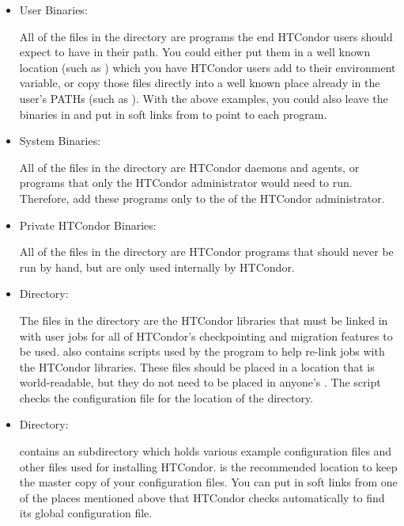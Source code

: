 \begin{description}
\begin{description}
\begin{itemize}
     \item User Binaries:

     All of the files in the  directory are programs the end
     HTCondor users should expect to have in their path.  You could
     either put them in a well known location (such as
     ) which you have HTCondor users add to
     their  environment variable, or copy those files
     directly into a well known place already in the user's PATHs (such as
     ).  With the above examples, you could also
     leave the binaries in  and put in
     soft links from  to point to each program.

     \item System Binaries:

     All of the files in the  directory are HTCondor daemons and
     agents, or programs that only the HTCondor administrator would need
     to run.  Therefore, add these programs only
     to the  of the HTCondor administrator.

     \item Private HTCondor Binaries:

     All of the files in the  directory are HTCondor
     programs that should never be run by hand, but are only used
     internally by HTCondor. 

     \item {} Directory:

     The files in the  directory are the HTCondor libraries that
     must be linked in with user jobs for all of HTCondor's
     checkpointing and migration features to be used.   also
     contains scripts used by the  program to help
     re-link jobs with the HTCondor libraries.  These files should be
     placed in a location that is world-readable, but they do not need
     to be placed in anyone's .  The  script checks
     the configuration file for the location of the  directory.

     \item {} Directory:

      contains an  subdirectory which holds various
     example configuration files and other files used for installing HTCondor.
      is the recommended location to keep the master copy of your
     configuration files.  You can put in soft links from one of the places
     mentioned above that HTCondor checks automatically to find its
     global configuration file. 
\end{itemize}


\end{description}
\end{description}
